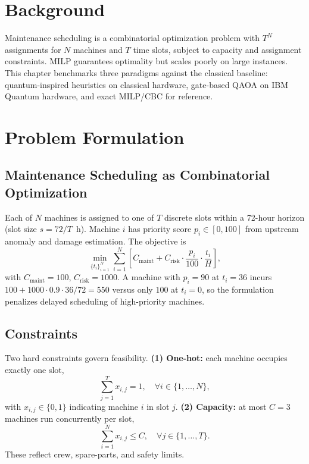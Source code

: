 \section{Background}
Maintenance scheduling is a combinatorial optimization problem with $T^N$ assignments for $N$ machines and $T$ time slots, subject to capacity and assignment constraints. MILP guarantees optimality but scales poorly on large instances. This chapter benchmarks three paradigms against the classical baseline: quantum-inspired heuristics on classical hardware, gate-based QAOA on IBM Quantum hardware, and exact MILP/CBC for reference.

\section{Problem Formulation}
\subsection{Maintenance Scheduling as Combinatorial Optimization}
Each of $N$ machines is assigned to one of $T$ discrete slots within a 72-hour horizon (slot size $s = 72/T$~h). Machine $i$ has priority score $p_i \in [0,100]$ from upstream anomaly and damage estimation. The objective is
\begin{equation}
\min_{ \{t_i\}_{i=1}^N }
\sum_{i=1}^{N}
\left[ C_{\text{maint}}
+ C_{\text{risk}} \cdot \frac{p_i}{100} \cdot \frac{t_i}{H} \right],
\end{equation}
with $C_{\text{maint}}=100$, $C_{\text{risk}}=1000$. A machine with $p_i=90$ at $t_i=36$ incurs $100 + 1000 \cdot 0.9 \cdot 36/72 = 550$ versus only $100$ at $t_i=0$, so the formulation penalizes delayed scheduling of high-priority machines.

\subsection{Constraints}
Two hard constraints govern feasibility. \textbf{(1) One-hot:} each machine occupies exactly one slot,
\begin{equation}
\sum_{j=1}^{T} x_{i,j} = 1, \quad \forall i \in \{1, \ldots, N\},
\end{equation}
with $x_{i,j} \in \{0,1\}$ indicating machine $i$ in slot $j$. \textbf{(2) Capacity:} at most $C=3$ machines run concurrently per slot,
\begin{equation}
\sum_{i=1}^{N} x_{i,j} \leq C, \quad \forall j \in \{1, \ldots, T\}.
\end{equation}
These reflect crew, spare-parts, and safety limits.


